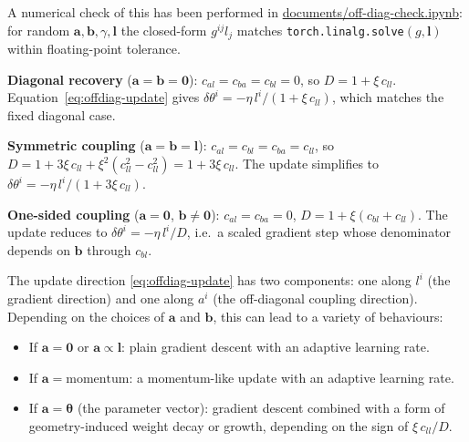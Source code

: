 \documentclass{article}
\newcommand{\vecb}[1]{\boldsymbol{#1}}
\begin{document}
\begin{sloppypar}
A numerical check of this has been performed in
\href{https://github.com/Noah-Everett/Induced-Metric-Optimiser/blob/main/documents/off-diag-check.ipynb}{documents/off-diag-check.ipynb}:
for random $\vecb{a},\vecb{b},\gamma,\vecb{l}$ the closed-form $g^{ij}l_j$ matches
\texttt{torch.linalg.solve}$(g,\vecb{l})$ within floating-point tolerance.
\end{sloppypar}

\begin{tcolorbox}[colback=gray!8, colframe=gray!22, breakable, title=\textbf{Sanity Checks}, coltitle=black]
    \textbf{Diagonal recovery} ($\vecb{a}=\vecb{b}=\vecb{0}$):
    $c_{al} = c_{ba} = c_{bl} = 0$, so $D = 1 + \xi\,c_{ll}$.
    Equation~\eqref{eq:offdiag-update} gives
    $\delta\theta^i = -\eta\,l^i/(1 + \xi\,c_{ll})$,
    which matches the fixed diagonal case. \checkmark

    \medskip\noindent
    \textbf{Symmetric coupling} ($\vecb{a}=\vecb{b}=\vecb{l}$):
    $c_{al}=c_{bl}=c_{ba}=c_{ll}$,
    so $D = 1 + 3\xi\,c_{ll} + \xi^2(c_{ll}^2 - c_{ll}^2) = 1+3\xi\,c_{ll}$.
    The update simplifies to
    $\delta\theta^i = -\eta\,l^i/(1+3\xi\,c_{ll})$. \checkmark

    \medskip\noindent
    \textbf{One-sided coupling} ($\vecb{a}=\vecb{0}$, $\vecb{b}\neq\vecb{0}$):
    $c_{al}=c_{ba}=0$, $D = 1 + \xi(c_{bl} + c_{ll})$.
    The update reduces to $\delta\theta^i = -\eta\,l^i/D$,
    i.e.\ a scaled gradient step whose denominator depends on $\vecb{b}$ through $c_{bl}$.
\end{tcolorbox}

\noindent
The update direction \eqref{eq:offdiag-update} has two components:
one along $l^i$ (the gradient direction) and one along $a^i$ (the off-diagonal coupling direction).
Depending on the choices of $\vecb{a}$ and $\vecb{b}$, this can lead to a variety of behaviours:
\begin{itemize}
    \item If $\vecb{a}=\vecb{0}$ or $\vecb{a}\propto \vecb{l}$: plain gradient descent with an adaptive learning rate.
    \item If $\vecb{a}=\text{momentum}$: a momentum-like update with an adaptive learning rate.
    \item If $\vecb{a}=\vecb{\theta}$ (the parameter vector): gradient descent combined with a form of
    geometry-induced weight decay or growth, depending on the sign of $\xi\,c_{ll}/D$.
\end{itemize}
\end{document}
